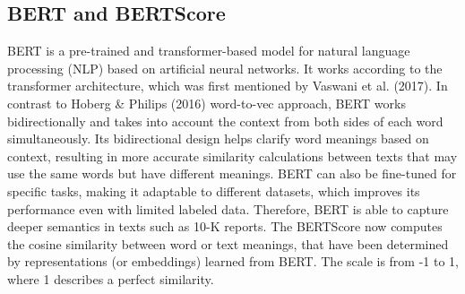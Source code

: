 \documentclass[
]{article}
\begin{document}
\begin{table}[H]
\centering
\caption{\label{tab:tbl-table1}10-K Sample Creation}
\centering
{}
\end{table}

\subsection{BERT and BERTScore}\label{bert-and-bertscore}

BERT is a pre-trained and transformer-based model for natural language
processing (NLP) based on artificial neural networks. It works according
to the transformer architecture, which was first mentioned by Vaswani et
al. (2017). In contrast to Hoberg \& Philips (2016) word-to-vec
approach, BERT works bidirectionally and takes into account the context
from both sides of each word simultaneously. Its bidirectional design
helps clarify word meanings based on context, resulting in more accurate
similarity calculations between texts that may use the same words but
have different meanings. BERT can also be fine-tuned for specific tasks,
making it adaptable to different datasets, which improves its
performance even with limited labeled data. Therefore, BERT is able to
capture deeper semantics in texts such as 10-K reports. The BERTScore
now computes the cosine similarity between word or text meanings, that
have been determined by representations (or embeddings) learned from
BERT. The scale is from -1 to 1, where 1 describes a perfect similarity.
\end{document}
